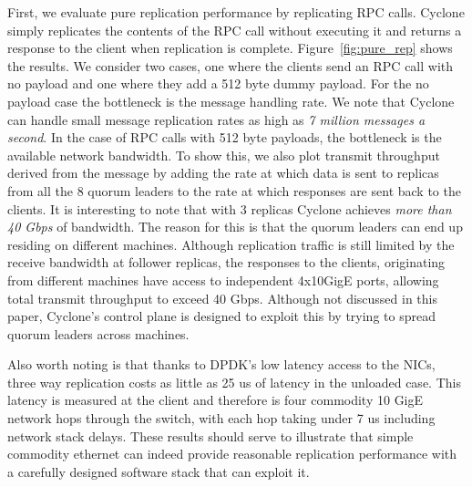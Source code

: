 \documentclass[letterpaper,twocolumn,10pt]{article}
\begin{document}
First, we evaluate pure replication performance by replicating RPC
calls. Cyclone simply replicates the contents of the RPC call without executing
it and returns a response to the client when replication is complete.
Figure~\ref{fig:pure_rep} shows the results. We consider two cases, one where
the clients send an RPC call with no payload and one where they add a 512 byte
dummy payload. For the no payload case the bottleneck is the message handling
rate. We note that Cyclone can handle small message replication rates as high as
\emph{7 million messages a second}. In the case of RPC calls with 512 byte
payloads, the bottleneck is the available network bandwidth. To show this, we
also plot transmit throughput derived from the message by adding the rate at
which data is sent to replicas from all the 8 quorum leaders to the rate at
which responses are sent back to the clients.  It is interesting to note that
with 3 replicas Cyclone achieves \emph{more than 40 Gbps} of bandwidth. The
reason for this is that the quorum leaders can end up residing on different
machines. Although replication traffic is still limited by the receive bandwidth
at follower replicas, the responses to the clients, originating from different
machines have access to independent 4x10GigE ports, allowing total transmit
throughput to exceed 40 Gbps. Although not discussed in this paper, Cyclone's
control plane is designed to exploit this by trying to spread quorum leaders
across machines.

Also worth noting is that thanks to DPDK's low latency access to the NICs, three
way replication costs as little as 25 us of latency in the unloaded case. This
latency is measured at the client and therefore is four commodity 10 GigE
network hops through the switch, with each hop taking under 7 us including
network stack delays. These results should serve to illustrate that simple
commodity ethernet can indeed provide reasonable replication performance with a
carefully designed software stack that can exploit it.
\end{document}
